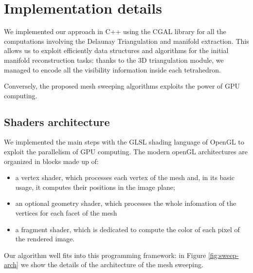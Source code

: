 \section{Implementation details}
We implemented our approach in C++ using the CGAL library \cite{cgal} for all the computations involving the Delaunay Triangulation and manifold extraction. This allows us to exploit efficiently data structures and algorithms for the initial manifold reconstruction tasks: thanks to the 3D triangulation module, we managed to encode all the visibility information inside each tetrahedron.

Conversely, the proposed mesh sweeping algorithms exploits the power of GPU computing. 
\subsection{Shaders architecture}
We implemented the main steps with the GLSL shading language of OpenGL \cite{opengl} to exploit the parallelism of GPU computing.
The modern openGL architectures are organized in blocks made up of:
\begin{itemize}
 \item a vertex shader, which processes each vertex of the mesh and, in its basic usage, it computes their positions in the image plane;
 \item an optional geometry shader, which processes the whole infomation of the vertices for each facet of the mesh
 \item a fragment shader, which is dedicated to compute the color of each pixel of the rendered image.
\end{itemize}
Our algorithm well fits into this programming framework: in Figure \ref{fig:sweep-arch} we show the details of the architecture of the mesh sweeping. 

